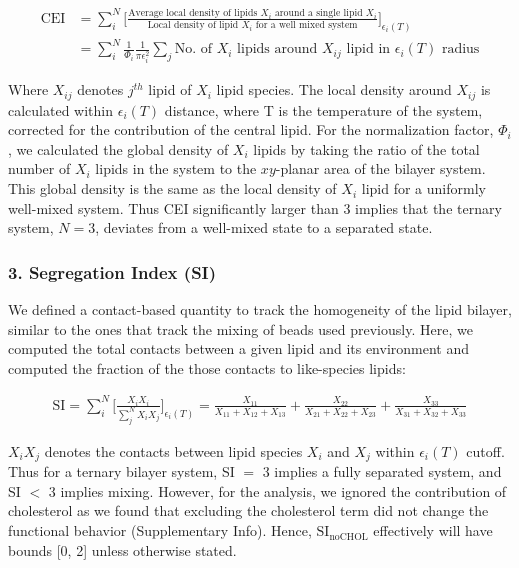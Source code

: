 \documentclass{biophys-new}
\begin{document}
\begin{equation}
    \begin{aligned}
    \label{eq:CLT}
    \text{CEI} {}   & = \sum_{i}^{N}\Bigg[\frac{\text{Average local density of lipids $X_i$ around a single lipid $X_i$}}{\text{Local density of lipid $X_i$ for a well mixed system}}\Bigg]_{\text{$\epsilon_i(T)$}} \\
                    & =  \sum_{i}^{N} \frac{1}{\Phi_i}\frac{1}{\text{$\pi\epsilon_i^2$}}\sum_{j}\text{No. of $X_i$ lipids around $X_{ij}$ lipid in $\epsilon_i(T)$ radius}
    \end{aligned}
\end{equation}

Where $X_{ij}$ denotes $j^{th}$ lipid of $X_i$ lipid species.
The local density around $X_{ij}$ is calculated within $\epsilon_i(T)$ distance, where T is the temperature of the system, corrected
for the contribution of the central lipid.
For the normalization factor, $\Phi_i$,  we calculated the global density of $X_i$ lipids by taking the ratio of the total number of $X_i$ lipids in the system to the $xy$-planar area of the bilayer system.
This global density is the same as the local density of $X_{i}$ lipid for a uniformly well-mixed system.
Thus CEI significantly larger than 3 implies that the ternary system, $N=3$, deviates from a well-mixed state to a separated state.

\subsubsection*{3. Segregation Index (SI)}

We defined a contact-based quantity to track the homogeneity of the lipid bilayer, similar to the ones that track the mixing of beads used previously\cite{Marigo2012, Kumar2020}.
Here, we computed the total contacts between a given lipid and its environment and computed the fraction of the those contacts to like-species lipids:

\begin{equation}
    \begin{aligned}
    \label{eq:CLT}
    \text{SI} = \sum_{i}^{N}\Bigg[\frac{X_iX_i}{\sum_{j}^{N}X_iX_j}\Bigg]_{\text{$\epsilon_i(T)$}} = \frac{X_{11}}{X_{11} + X_{12} + X_{13}} + \frac{X_{22}}{X_{21} + X_{22} + X_{23}} + \frac{X_{33}}{X_{31} + X_{32} + X_{33}}
    \end{aligned}
\end{equation}

$X_iX_j$ denotes the contacts between lipid species $X_i$ and $X_j$ within $\epsilon_i(T)$ cutoff.
Thus for a ternary bilayer system, SI $=$ 3 implies a fully separated system, and SI $<$ 3 implies mixing.
However, for the analysis, we ignored the contribution of cholesterol as we found that excluding the cholesterol term did not change the functional behavior (Supplementary Info).
Hence, $\text{SI}_{\text{noCHOL}}$ effectively will have bounds [0, 2] unless otherwise stated.    
\end{document}
